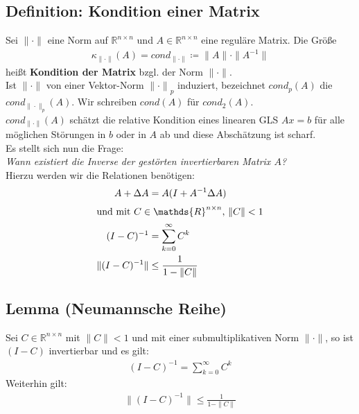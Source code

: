 \documentclass[ngerman,fontsize=11pt, paper=a4, parskip=half, titlepage=true, toc=bib]{scrbook}
\newcommand{\R}{\mathds{R}}
\newcommand{\Renn}{\mathds{R}^{n\times n}}
\begin{document}
  \subsection{Definition: Kondition einer Matrix} 
  Sei $\|\cdot\|$ eine Norm auf $\R^{n\times n} $ und $A\in \R^{n\times n}$ eine reguläre Matrix.
  Die Größe
  \begin{gather*}
    \kappa_{\|\cdot\|}(A) = cond_{\|\cdot\|} \coloneqq \|A\| \cdot \|A^{-1}\|
  \end{gather*}
  heißt \textbf{Kondition der Matrix} bzgl. der Norm ${\|\cdot\|}$. \\
  Ist  ${\|\cdot\|}$ von einer Vektor-Norm ${\|\cdot\|}_p$ induziert, bezeichnet 
  $cond_p(A)$
  die $cond_{\|\cdot\|_p}(A)$. Wir schreiben $cond(A)$ für $cond_2(A)$. \\
  $cond_{\|\cdot\|}(A) $ schätzt die relative Kondition eines linearen GLS $Ax=b$ für alle möglichen 
  Störungen in $b$ oder in $A$ ab und diese Abschätzung ist scharf. \\

  Es stellt sich nun die Frage: \\
  \textit{Wann existiert die Inverse der gestörten invertierbaren Matrix $A$?} \\
  Hierzu werden wir die Relationen benötigen:
  \begin{align*}
    A+\Delta A &= A (I+A^{-1}\Delta A)\\
    \intertext{und mit $C \in \Renn,\, \|C\| < 1$}
    (I-C)^{-1} &= \sum_{k=0}^{\infty}C^k \\
    \|	(I-C)^{-1} \| &\leq \frac{1}{1-\|C\|}
  \end{align*}

  \subsection{Lemma (Neumannsche Reihe)}\label{3.2.12}
  \addtocounter{equation}{1}
  Sei $C\in\Renn$ mit $\|C\|<1$ und mit einer submultiplikativen Norm $\|\cdot\|$,
  so ist $(I-C)$ invertierbar und es gilt:
  \begin{gather*}
    (I-C)^{-1}=\sum_{k=0}^{\infty}C^k
  \end{gather*}
  Weiterhin gilt:
  \begin{gather*}
    \|(I-C)^ {-1}\| \leq \frac{1}{1-\|C\|}
  \end{gather*}
\end{document}
